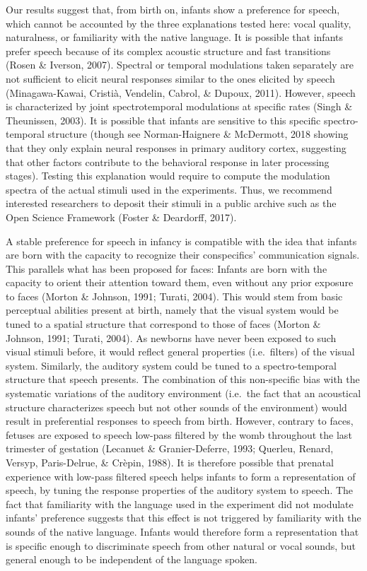 \documentclass[
  man,mask,floatsintext]{apa6}
\begin{document}
Our results suggest that, from birth on, infants show a preference for speech, which cannot be accounted by the three explanations tested here: vocal quality, naturalness, or familiarity with the native language. It is possible that infants prefer speech because of its complex acoustic structure and fast transitions (Rosen \& Iverson, 2007). Spectral or temporal modulations taken separately are not sufficient to elicit neural responses similar to the ones elicited by speech (Minagawa-Kawai, Cristià, Vendelin, Cabrol, \& Dupoux, 2011). However, speech is characterized by joint spectrotemporal modulations at specific rates (Singh \& Theunissen, 2003). It is possible that infants are sensitive to this specific spectro-temporal structure (though see Norman-Haignere \& McDermott, 2018 showing that they only explain neural responses in primary auditory cortex, suggesting that other factors contribute to the behavioral response in later processing stages). Testing this explanation would require to compute the modulation spectra of the actual stimuli used in the experiments. Thus, we recommend interested researchers to deposit their stimuli in a public archive such as the Open Science Framework (Foster \& Deardorff, 2017).

A stable preference for speech in infancy is compatible with the idea that infants are born with the capacity to recognize their conspecifics' communication signals. This parallels what has been proposed for faces: Infants are born with the capacity to orient their attention toward them, even without any prior exposure to faces (Morton \& Johnson, 1991; Turati, 2004).
This would stem from basic perceptual abilities present at birth, namely that the visual system would be tuned to a spatial structure that correspond to those of faces (Morton \& Johnson, 1991; Turati, 2004). As newborns have never been exposed to such visual stimuli before, it would reflect general properties (i.e.~filters) of the visual system. Similarly, the auditory system could be tuned to a spectro-temporal structure that speech presents. The combination of this non-specific bias with the systematic variations of the auditory environment (i.e.~the fact that an acoustical structure characterizes speech but not other sounds of the environment) would result in preferential responses to speech from birth. However, contrary to faces, fetuses are exposed to speech low-pass filtered by the womb throughout the last trimester of gestation (Lecanuet \& Granier-Deferre, 1993; Querleu, Renard, Versyp, Paris-Delrue, \& Crèpin, 1988). It is therefore possible that prenatal experience with low-pass filtered speech helps infants to form a representation of speech, by tuning the response properties of the auditory system to speech.
The fact that familiarity with the language used in the experiment did not modulate infants' preference suggests that this effect is not triggered by familiarity with the sounds of the native language. Infants would therefore form a representation that is specific enough to discriminate speech from other natural or vocal sounds, but general enough to be independent of the language spoken.
\end{document}
